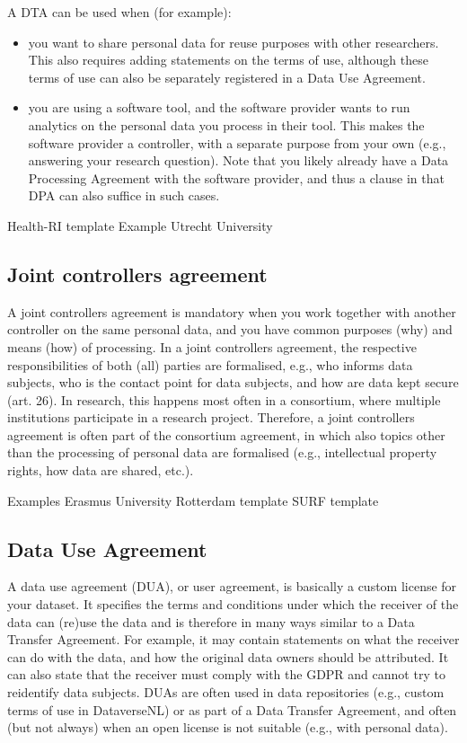 \documentclass[
]{book}
\providecommand{\tightlist}{%
  \setlength{\itemsep}{0pt}\setlength{\parskip}{0pt}}
\begin{document}
A DTA can be used when (for example):

\begin{itemize}
\tightlist
\item
  you want to share personal data for reuse purposes with other researchers.
  This also requires adding statements on the terms of use, although these terms
  of use can also be separately registered in a
  Data Use Agreement.
\item
  you are using a software tool, and the software provider wants to run
  analytics on the personal data you process in their tool. This makes the
  software provider a controller, with a separate purpose from your own (e.g.,
  answering your research question). Note that you likely already have a
  Data Processing Agreement with the
  software provider, and thus a clause in that DPA can also suffice in such cases.
\end{itemize}

Health-RI template
Example Utrecht University

\hypertarget{joint-controller-agreement}{%
\subsection{Joint controllers agreement}\label{joint-controller-agreement}}

A joint controllers agreement is mandatory when you work together with another
controller on the same personal data, and you have common purposes (why) and
means (how) of processing. In a joint controllers agreement, the respective
responsibilities of both (all) parties are formalised, e.g., who informs data
subjects, who is the contact point for data subjects, and how are data kept
secure (art. 26).
In research, this happens most often in a consortium, where multiple institutions
participate in a research project. Therefore, a joint controllers agreement is
often part of the consortium agreement, in which also topics other than the
processing of personal data are formalised (e.g., intellectual property rights,
how data are shared, etc.).

Examples
Erasmus University Rotterdam template
SURF template

\hypertarget{user-agreement}{%
\subsection{Data Use Agreement}\label{user-agreement}}

A data use agreement (DUA), or user agreement, is basically a custom license for
your dataset. It specifies the terms and conditions under which the receiver of
the data can (re)use the data and is therefore in many ways similar to a
Data Transfer Agreement. For example,
it may contain statements on what the receiver can do with the data, and how
the original data owners should be attributed. It can also state that the
receiver must comply with the GDPR and cannot try to reidentify data subjects.
DUAs are often used in data repositories (e.g., custom terms of use in
DataverseNL) or as part of a Data Transfer Agreement, and often (but not always)
when an open license is not suitable (e.g., with personal data).
\end{document}
